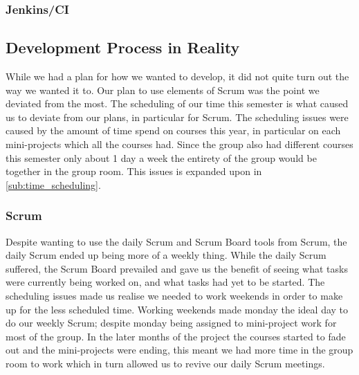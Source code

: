 \subsubsection{Jenkins/CI}
\subsection{Development Process in Reality}
While we had a plan for how we wanted to develop, it did not quite turn out the way we wanted it to.
Our plan to use elements of Scrum was the point we deviated from the most.
The scheduling of our time this semester is what caused us to deviate from our plans, in particular for Scrum.
The scheduling issues were caused by the amount of time spend on courses this year, in particular on each mini-projects which all the courses had.
Since the group also had different courses this semester only about 1 day a week the entirety of the group would be together in the group room.
This issues is expanded upon in \cref{sub:time_scheduling}.
\subsubsection{Scrum}
Despite wanting to use the daily Scrum and Scrum Board tools from Scrum, the daily Scrum ended up being more of a weekly thing.
While the daily Scrum suffered, the Scrum Board prevailed and gave us the benefit of seeing what tasks were currently being worked on, and what tasks had yet to be started.
The scheduling issues made us realise we needed to work weekends in order to make up for the less scheduled time.
Working weekends made monday the ideal day to do our weekly Scrum; despite monday being assigned to mini-project work for most of the group.
In the later months of the project the courses started to fade out and the mini-projects were ending, this meant we had more time in the group room to work which in turn allowed us to revive our daily Scrum meetings.

